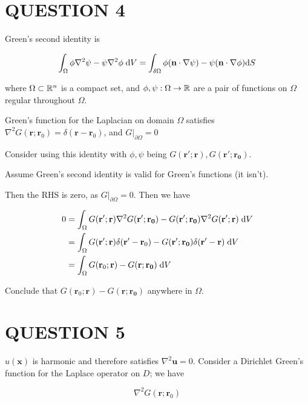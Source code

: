 \documentclass[a4paper]{article}
\begin{document}
\section{QUESTION 4}

Green's second identity is 

\[ \int_{\Omega}  \phi \nabla^{2} \psi  - \psi \nabla^{2} \phi \;  \mathrm{d} V = \int_{\delta \Omega} \phi ( \mathbf{n} \cdot \nabla \psi ) - \psi( \mathbf{n} \cdot \nabla \phi ) \mathrm{d} S   \]

where $ \Omega \subset \mathbb{R}^{n} $ is a compact set, and $ \phi, \psi : \Omega \to \mathbb{R} $ are a pair of functions on $ \Omega $ regular throughout $ \Omega $.

Green's function for the Laplacian on domain $ \Omega $ satisfies $ \nabla^{2} G(\mathbf{r};\mathbf{r}_{0}) = \delta(\mathbf{r} - \mathbf{r}_{0}) $, and $ G |_{\partial \Omega} = 0 $

Consider using this identity with $ \phi, \psi $ being $ G(\mathbf{r}'; \mathbf{r}), G(\mathbf{r}'; \mathbf{r_{0}})  $.

Assume Green's second identity is valid for Green's functions (it isn't).

Then the RHS is zero, as $ G |_{\partial \Omega} = 0 $. Then we have

\begin{align*}
0 & = \int_{\Omega}  G(\mathbf{r}'; \mathbf{r}) \nabla^{2} G(\mathbf{r}'; \mathbf{r_{0}}) - G(\mathbf{r}'; \mathbf{r_{0}}) \nabla^{2} G(\mathbf{r}'; \mathbf{r}) \;  \mathrm{d} V \\
& = \int_{\Omega}  G(\mathbf{r}'; \mathbf{r}) \delta(\mathbf{r}' - \mathbf{r}_{0}) - G(\mathbf{r}'; \mathbf{r_{0}}) \delta(\mathbf{r}' - \mathbf{r}) \;  \mathrm{d} V \\
& = \int_{\Omega}  G(\mathbf{r}_{0}; \mathbf{r})  - G(\mathbf{r}; \mathbf{r_{0}}) \;  \mathrm{d} V
\end{align*}

Conclude that $ G(\mathbf{r}_{0}; \mathbf{r})  - G(\mathbf{r}; \mathbf{r_{0}}) $ anywhere in $ \Omega $.

\section{QUESTION 5}

$ u(\mathbf{x}) $ is harmonic and therefore satisfies $ \nabla^{2} \mathbf{u} = 0 $. Consider a Dirichlet Green's function for the Laplace operator on $ D $; we have

\[ \nabla^{2} G ( \mathbf{r} ; \mathbf{r}_{0}) \]
\end{document}
